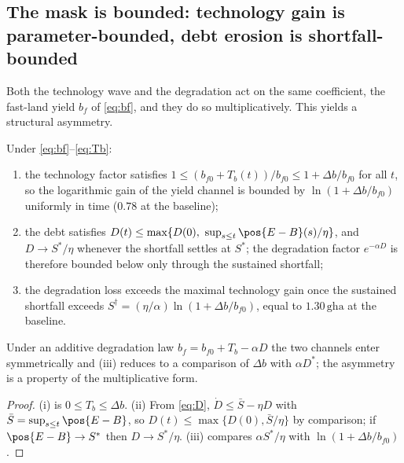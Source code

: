 \subsection{The mask is bounded: technology gain is parameter-bounded, debt erosion is shortfall-bounded}\label{sec:bounded}

Both the technology wave and the degradation act on the same coefficient, the fast-land yield $b_f$ of \eqref{eq:bf}, and they do so multiplicatively. This yields a structural asymmetry.

\begin{proposition}\label{prop:bounded}
Under \eqref{eq:bf}--\eqref{eq:Tb}:
\begin{enumerate}[label=(\roman*)]
\item the technology factor satisfies $1\le(b_{f0}+T_b(t))/b_{f0}\le1+\Delta b/b_{f0}$ for all $t$, so the logarithmic gain of the yield channel is bounded by $\ln(1+\Delta b/b_{f0})$ uniformly in time ($0.78$ at the baseline);
\item the debt satisfies $D(t)\le\max\{D(0),\ \sup_{s\le t}\pos{E-B}(s)/\eta\}$, and $D\to S^*/\eta$ whenever the shortfall settles at $S^*$; the degradation factor $e^{-\alpha D}$ is therefore bounded below only through the sustained shortfall;
\item the degradation loss exceeds the maximal technology gain once the sustained shortfall exceeds $S^\dagger=(\eta/\alpha)\ln(1+\Delta b/b_{f0})$, equal to $1.30\,\mathrm{gha}$ at the baseline.
\end{enumerate}
Under an additive degradation law $b_f=b_{f0}+T_b-\alpha D$ the two channels enter symmetrically and (iii) reduces to a comparison of $\Delta b$ with $\alpha D^*$; the asymmetry is a property of the multiplicative form.
\end{proposition}

\begin{proof}
(i) is $0\le T_b\le\Delta b$. (ii) From \eqref{eq:D}, $\dot D\le\bar S-\eta D$ with $\bar S=\sup_{s\le t}\pos{E-B}$, so $D(t)\le\max\{D(0),\bar S/\eta\}$ by comparison; if $\pos{E-B}\to S^*$ then $D\to S^*/\eta$. (iii) compares $\alpha S^*/\eta$ with $\ln(1+\Delta b/b_{f0})$.
\end{proof}


